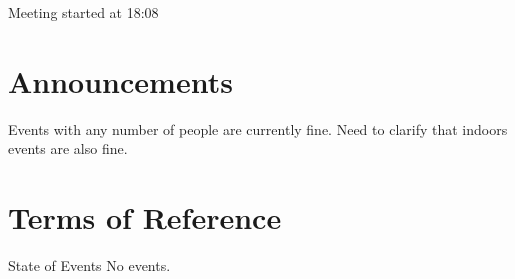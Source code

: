 \documentclass[11pt,hacksoc]{meetingmins}
\begin{document}
\maketitle

\begin{items}
  \item {Meeting started at 18:08}
\end{items}

\section{Announcements}
\begin{items}
  \item {Events with any number of people are currently fine.}
  \subitem Need to clarify that indoors events are also fine.
\end{items}


\section{Terms of Reference}
\begin{items}
  \item {State of Events}
  \subitem No events.
\end{items}

\end{document}
